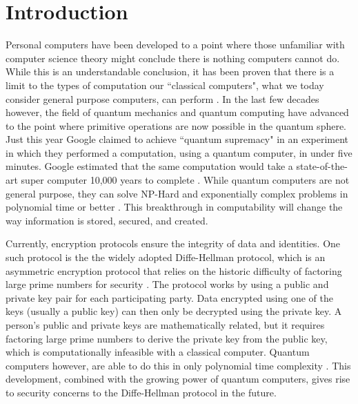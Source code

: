 \chapter{Introduction}
\label{chap:introduction}

Personal computers have been developed to a point where those unfamiliar with computer science theory might conclude there is nothing computers cannot do.
While this is an understandable conclusion, it has been proven that there is a limit to the types of computation our ``classical computers", what we today consider general purpose computers, can perform \cite{linz}.
In the last few decades however, the field of quantum mechanics and quantum computing have advanced to the point where primitive operations are now possible in the quantum sphere.
Just this year Google claimed to achieve ``quantum supremacy" in an experiment in which they performed a computation, using a quantum computer, in under five minutes. 
Google estimated that the same computation would take a state-of-the-art super computer 10,000 years to complete \cite{quantum_supremacy}. 
While quantum computers are not general purpose, they can solve NP-Hard and exponentially complex problems in polynomial time or better \cite{MikeAndIke}.
This breakthrough in computability will change the way information is stored, secured, and created.

Currently, encryption protocols ensure the integrity of data and identities.
One such protocol is the the widely adopted Diffe-Hellman protocol, which is an asymmetric encryption protocol that relies on the historic difficulty of factoring large prime numbers for security \cite{qc:agi}.
The protocol works by using a public and private key pair for each participating party.
Data encrypted using one of the keys (usually a public key) can then only be decrypted using the private key.
A person's public and private keys are mathematically related, but it requires factoring large prime numbers to derive the private key from the public key, which is computationally infeasible with a classical computer.
Quantum computers however, are able to do this in only polynomial time complexity \cite{doi:10.1137/S0036144598347011}.
This development, combined with the growing power of quantum computers, gives rise to security concerns to the Diffe-Hellman protocol in the future.

